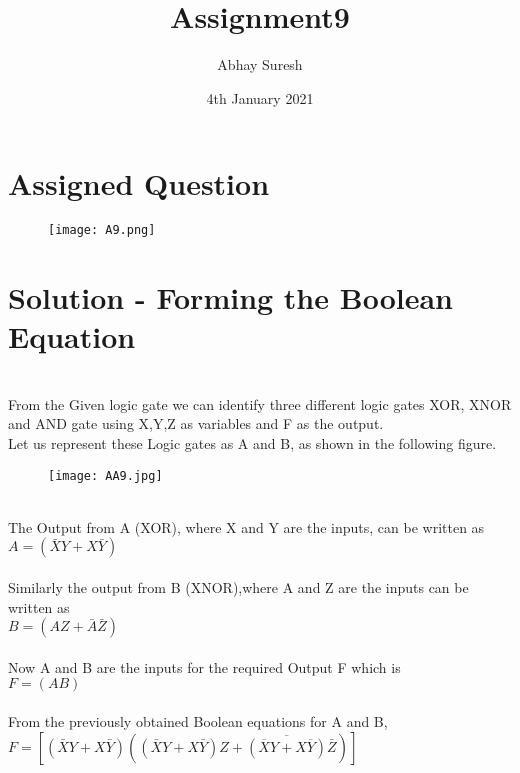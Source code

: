 \documentclass{article}
\title{Assignment9}
\author{Abhay Suresh}
\date{4th January 2021}
\begin{document}
\maketitle

\section{Assigned Question}
\begin{figure}[htp]
    \centering
    \texttt{[image: A9.png]}
\end{figure}
\section {Solution - Forming the Boolean Equation}
\\
From the Given logic gate we can identify three different logic gates XOR, XNOR and AND gate using X,Y,Z as variables and F as the output.
\\
Let us represent these Logic gates as A and B, as shown in the following figure.

\begin{figure}[htp]
    \centering
    \texttt{[image: AA9.jpg]}
\end{figure}
\\
The Output from A (XOR), where X and Y are the inputs, can be written as
\\
\bold $A = (\bar{X}{Y} + {X}\bar{Y})$
\\
\\
Similarly the output from B (XNOR),where A and Z are the inputs can be written as
\\
$B = ({A}{Z} + \bar{A}\bar{Z})$
\\
\\
Now A and B are the inputs for the required Output F which is
\\
$F = ({A}{B})$
\\
\\
From the previously obtained Boolean equations for A and B,
\\$F = [(\bar{X}{Y} + {X}\bar{Y})({(\bar{X}{Y} + {X}\bar{Y})}{Z} + \overline{(\overline{X}{Y} + {X}\overline{Y})}\bar{Z})]$
\\
\\
\end{document}
